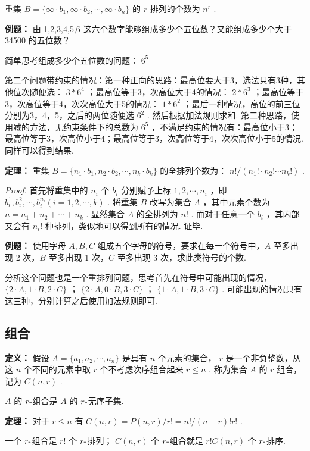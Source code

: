 \documentclass[cn, hazy, blue, normal, 12pt]{elegantnote}
\begin{document}
重集 $ B=\{\infty\cdot b_1,\infty\cdot b_2,\cdots ,\infty\cdot b_n\} $ 的 $ r $ 排列的个数为 $ n^r $ .

\textbf{例题：} 由 1,2,3,4,5,6 这六个数字能够组成多少个五位数？又能组成多少个大于 34500 的五位数？

简单思考组成多少个五位数的问题： $ 6^5 $

第二个问题带约束的情况：第一种正向的思路：最高位要大于3，选法只有3种，其他位次随便选： $ 3 * 6^4 $ ；最高位等于3，次高位大于4的情况： $ 2*6^3 $ ；最高位等于3，次高位等于4，次次高位大于5的情况： $ 1 * 6^2 $ ；最后一种情况，高位的前三位分别为3，4，5，之后的两位随便选 $ 6^2 $ . 然后根据加法规则求和. 第二种思路，使用减的方法，无约束条件下的总数为 $ 6^5 $ ，不满足约束的情况有：最高位小于3；最高位等于3，次高位小于4；最高位等于3，次高位等于4，次次高位小于5的情况. 同样可以得到结果.

\textbf{定理：} 重集 $ B=\{n_1\cdot b_1,n_2\cdot b_2,\cdots, n_k\cdot b_k\} $ 的全排列个数为： $ n!/(n_1!\cdot n_2! \cdots n_k!) $ .

\textit{Proof.} 首先将重集中的 $ n_i $ 个 $ b_i $ 分别赋予上标 $ 1,2,\cdots,n_i $ ，即 $ b_i^1,b_i^2,\cdots,b_i^{n_i}(i=1,2,\cdots,k) $ . 将重集 $ B $ 改写为集合 $ A $ ，其中元素个数为 $ n=n_1+n_2+\cdots+n_k $ . 显然集合 $ A $ 的全排列为 $ n! $ . 而对于任意一个 $ b_i $ ，其内部又会有 $ n_i! $ 种排列，类似地可以得到所有的情况. 证毕.

\textbf{例题：} 使用字母 $A,B,C$ 组成五个字母的符号，要求在每一个符号中，$A$ 至多出现 2 次，$B$ 至多出现 1 次，$C$ 至多出现 3 次，求此类符号的个数.

分析这个问题也是一个重排列问题，思考首先在符号中可能出现的情况， $ \{2\cdot A,1\cdot B,2\cdot C\} $ ； $ \{2\cdot A, 0\cdot B, 3\cdot C\} $ ； $ \{1\cdot A,1\cdot B,3\cdot C\} $ . 可能出现的情况只有这三种，分别计算之后使用加法规则即可.

\subsection{组合}

\textbf{定义：} 假设 $ A=\{a_1,a_2,\cdots ,a_n\} $ 是具有 $ n $ 个元素的集合， $ r $ 是一个非负整数，从这 $ n $ 个不同的元素中取 $ r $ 个不考虑次序组合起来 $ r \leq n $ , 称为集合 $ A $ 的 $ r $ 组合，记为 $ C(n,r) $ .

$A$ 的 $r {\text -}$组合是 $A$ 的 $r {\text -}$无序子集.

\textbf{定理：} 对于 $ r\leq n $ 有 $ C(n,r)=P(n,r)/r!=n!/(n-r)!r! $ .

一个 $ r{\text -} $组合是 $r!$ 个 $ r{\text -} $排列； $ C(n,r) $ 个 $ r{\text -} $组合就是 $ r!C(n,r) $ 个 $ r{\text -} $排序.
\end{document}
